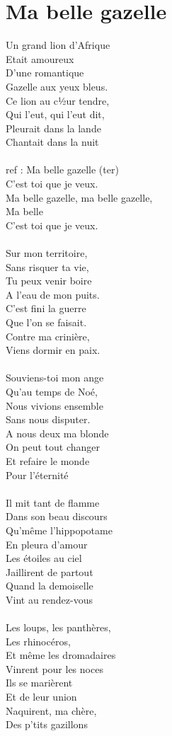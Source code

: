 \section*{Ma belle gazelle}
Un grand lion d’Afrique\\
Etait amoureux\\
D’une romantique\\
Gazelle aux yeux bleus.\\
Ce lion au c½ur tendre,\\
Qui l’eut, qui l’eut dit,\\
Pleurait dans la lande\\
Chantait dans la nuit\\\\
ref : Ma belle gazelle (ter)\\
C’est toi que je veux.\\
Ma belle gazelle, ma belle gazelle,\\
Ma belle\\
C’est toi que je veux.\\\\
Sur mon territoire,\\
Sans risquer ta vie,\\
Tu peux venir boire\\
A l’eau de mon puits.\\
C’est fini la guerre\\
Que l’on se faisait.\\
Contre ma crinière,\\
Viens dormir en paix.\\\\
Souviens-toi mon ange\\
Qu’au temps de Noé,\\
Nous vivions ensemble\\
Sans nous disputer.\\
A nous deux ma blonde\\
On peut tout changer\\
Et refaire le monde\\
Pour l’éternité\\\\
Il mit tant de flamme\\
Dans son beau discours\\
Qu’même l’hippopotame\\
En pleura d’amour\\
Les étoiles au ciel\\
Jaillirent de partout\\
Quand la demoiselle\\
Vint au rendez-vous\\\\
Les loups, les panthères,\\
Les rhinocéros,\\
Et même les dromadaires\\
Vinrent pour les noces\\
Ils se marièrent\\
Et de leur union\\
Naquirent, ma chère,\\
Des p’tits gazillons\\
